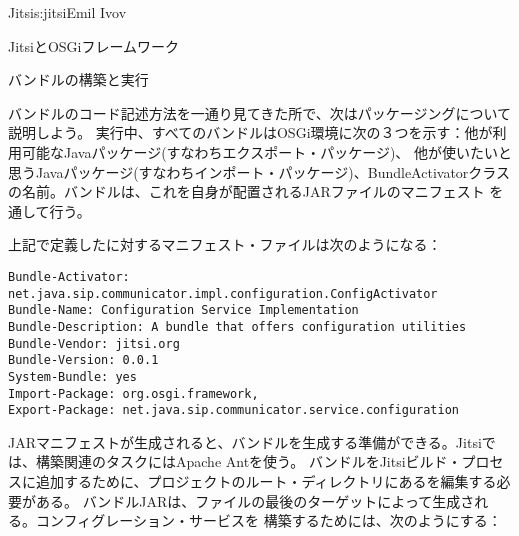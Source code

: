 \begin{aosachapter}{Jitsi}{s:jitsi}{Emil Ivov}
\begin{aosasect1}{JitsiとOSGiフレームワーク}

\end{aosasect1}

\begin{aosasect1}{バンドルの構築と実行}

バンドルのコード記述方法を一通り見てきた所で、次はパッケージングについて説明しよう。
実行中、すべてのバンドルはOSGi環境に次の３つを示す：他が利用可能なJavaパッケージ(すなわちエクスポート・パッケージ)、
他が使いたいと思うJavaパッケージ(すなわちインポート・パッケージ)、BundleActivatorクラスの名前。バンドルは、これを自身が配置されるJARファイルのマニフェスト
を通して行う。

上記で定義したに対するマニフェスト・ファイルは次のようになる：

\begin{verbatim}
Bundle-Activator: net.java.sip.communicator.impl.configuration.ConfigActivator
Bundle-Name: Configuration Service Implementation
Bundle-Description: A bundle that offers configuration utilities
Bundle-Vendor: jitsi.org
Bundle-Version: 0.0.1
System-Bundle: yes
Import-Package: org.osgi.framework,
Export-Package: net.java.sip.communicator.service.configuration
\end{verbatim}

JARマニフェストが生成されると、バンドルを生成する準備ができる。Jitsiでは、構築関連のタスクにはApache Antを使う。
バンドルをJitsiビルド・プロセスに追加するために、プロジェクトのルート・ディレクトリにあるを編集する必要がある。
バンドルJARは、ファイルの最後のターゲットによって生成される。コンフィグレーション・サービスを
構築するためには、次のようにする：


\end{aosasect1}
\end{aosachapter}
